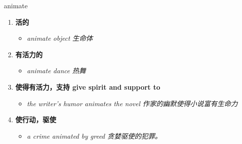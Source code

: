 
\begin{frame}
{\huge animate}
\begin{center}
\begin{enumerate}\Large
  \item \textbf{活的}
  \begin{itemize}
    \item \em{\Large{animate object 生命体}}
  \end{itemize}
  \item \textbf{有活力的}
  \begin{itemize}
    \item \em{\Large{animate dance 热舞}}
  \end{itemize}
  \item \textbf{使得有活力，支持 give spirit and support to}
  \begin{itemize}
    \item \em{\Large{the writer's humor animates the novel 作家的幽默使得小说富有生命力}}
  \end{itemize}
  \item \textbf{使行动，驱使}
  \begin{itemize}
    \item \em{\Large{a crime animated by greed 贪婪驱使的犯罪。}}
  \end{itemize}
\end{enumerate}
\end{center}
\end{frame}

